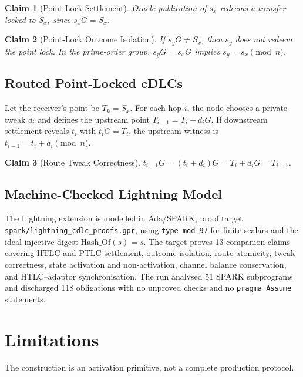 \documentclass[11pt,a4paper]{article}
\newcommand{\code}[1]{\texttt{#1}}
\theoremstyle{claimstyle}
\newtheorem{claim}{Claim}[section]
\begin{document}
\begin{claim}[Point-Lock Settlement]
Oracle publication of $s_x$ redeems a transfer locked to $S_x$, since
$s_x G = S_x$.
\end{claim}

\begin{claim}[Point-Lock Outcome Isolation]
If $s_y G \neq S_x$, then $s_y$ does not redeem the point lock. In the
prime-order group, $s_y G = s_x G$ implies $s_y = s_x \pmod{n}$.
\end{claim}

\subsection{Routed Point-Locked cDLCs}

Let the receiver's point be $T_k = S_x$. For each hop $i$, the node chooses a
private tweak $d_i$ and defines the upstream point $T_{i-1} = T_i + d_i G$.
If downstream settlement reveals $t_i$ with $t_i G = T_i$, the upstream witness
is $t_{i-1} = t_i + d_i \pmod{n}$.

\begin{claim}[Route Tweak Correctness]
$t_{i-1}G = (t_i+d_i)G = T_i + d_i G = T_{i-1}$.
\end{claim}

\subsection{Machine-Checked Lightning Model}

The Lightning extension is modelled in Ada/SPARK, proof target
\code{spark/lightning\_cdlc\_proofs.gpr}, using \code{type mod 97} for finite
scalars and the ideal injective digest $\mathrm{Hash\_Of}(s) = s$. The target
proves 13 companion claims covering HTLC and PTLC settlement, outcome isolation,
route atomicity, tweak correctness, state activation and non-activation, channel
balance conservation, and HTLC--adaptor synchronisation. The run analysed 51
SPARK subprograms and discharged 118 obligations with no unproved checks and no
\code{pragma Assume} statements.

\section{Limitations}
\label{sec:limitations}

The construction is an activation primitive, not a complete production protocol.
\end{document}
